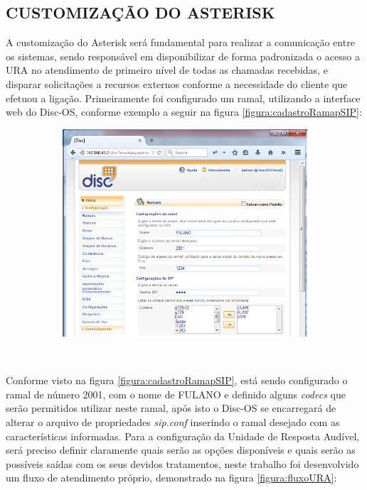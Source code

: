 \subsection{\textbf{\uppercase{Customização do Asterisk}}}

A customização do Asterisk será fundamental para realizar a comunicação entre os sistemas, sendo responsável em disponibilizar de forma padronizada o acesso a URA no atendimento de primeiro nível de todas as chamadas recebidas, e disparar solicitações a recursos externos conforme a necessidade do cliente que efetuou a ligação.
Primeiramente foi configurado um ramal, utilizando a interface web do Disc-OS, conforme exemplo a seguir na figura \ref{figura:cadastroRamapSIP}:


\begin{figure}[H]
	\centering
	\caption{\textbf{Cadastro de um Ramal SIP.}}	
	\label{figura:cadastroRamapSIP}
		\begin{subfigure}[H]{\textwidth}
			\centering
			\includegraphics{figuras/cadastro_ramal_sip.png}
		\end{subfigure}
	\\[6pt]
	\fontsize{10}{12}\selectfont {Fonte: Autoria Própria.}
\end{figure}


Conforme visto na figura \ref{figura:cadastroRamapSIP}, está sendo configurado o ramal de número 2001, com o nome de FULANO e definido alguns \textit{codecs} que serão permitidos utilizar neste ramal, após isto o Disc-OS se encarregará de alterar o arquivo de propriedades \textit{sip.conf} inserindo o ramal desejado com as características informadas.
Para a configuração da Unidade de Resposta Audível, será preciso definir claramente quais serão as opções disponíveis e quais serão as possíveis saídas com os seus devidos tratamentos, neste trabalho foi desenvolvido um fluxo de atendimento próprio, demonstrado na figura \ref{figura:fluxoURA}: 


